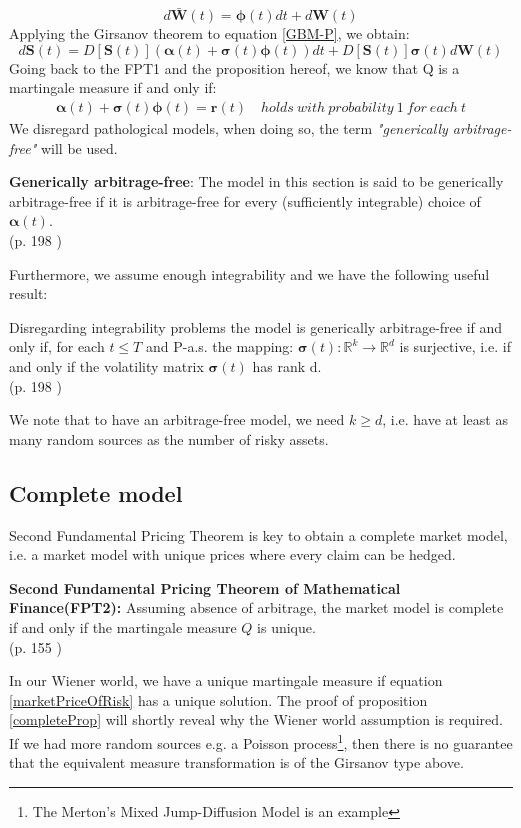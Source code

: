 $$d\bm{\bar{W}}(t)=\bm{\phi}(t)dt + d\bm{W}(t)$$
Applying the Girsanov theorem to equation \eqref{GBM-P}, we obtain:
$$d\bm{S}(t)=D[\bm{S}(t)](\bm{\alpha}(t)+\bm{\sigma}(t)\bm{\phi}(t))dt+D[\bm{S}(t)]\bm{\sigma}(t)d\bm{W}(t)$$
Going back to the FPT1 and the proposition hereof, we know that Q is a martingale measure if and only if:
\begin{align}\label{marketPriceOfRisk}
\bm{\alpha}(t)+\bm{\sigma}(t)\bm{\phi}(t)=\textbf{r}(t) \quad holds \ with \ probability \ 1 \ for \ each \ t
\end{align}
We disregard pathological models, when doing so, the term \textsl{"generically arbitrage-free"} will be used. 

\theoremstyle{definition}
\begin{definition}{\textbf{Generically arbitrage-free}:}
The model in this section is said to be generically arbitrage-free if it is arbitrage-free for every (sufficiently integrable) choice of $\bm{\alpha}(t)$.
\\ \null \hfill (p. 198 \parencite{finKont})
\end{definition}

Furthermore, we assume enough integrability and we have the following useful result:
\theoremstyle{proposition}
\begin{proposition}{}\label{arbitrageFreeProp}
Disregarding integrability problems the model is generically arbitrage-free if and only if, for each $t\leq T$ and P-a.s. the mapping:
$\bm{\sigma}(t):\mathbb{R}^k \to \mathbb{R}^d$ is surjective, i.e. if and only if the volatility matrix $\bm{\sigma}(t)$ has rank d.
\\ \null \hfill(p. 198 \parencite{finKont})
\end{proposition}
We note that to have an arbitrage-free model, we need $k\geq d$, i.e. have at least as many random sources as the number of risky assets. 

\subsection{Complete model}
Second Fundamental Pricing Theorem is key to obtain a complete market model, i.e. a market model with unique prices where every claim can be hedged.
\begin{theorem}\label{FFT2}
\textbf{Second Fundamental Pricing Theorem of Mathematical Finance(FPT2): } Assuming absence of arbitrage, the market model is complete if and only if the martingale measure $Q$ is unique.
\\ \null \hfill (p. 155 \parencite{finKont})
\end{theorem}
In our Wiener world, we have a unique martingale measure if equation \ref{marketPriceOfRisk} has a unique solution. The proof of proposition \ref{completeProp} will shortly reveal why the Wiener world assumption is required. If we had more random sources e.g. a Poisson process\footnote{The Merton's Mixed Jump-Diffusion Model is an example}, then there is no guarantee that the equivalent measure transformation is of the Girsanov type above. 

